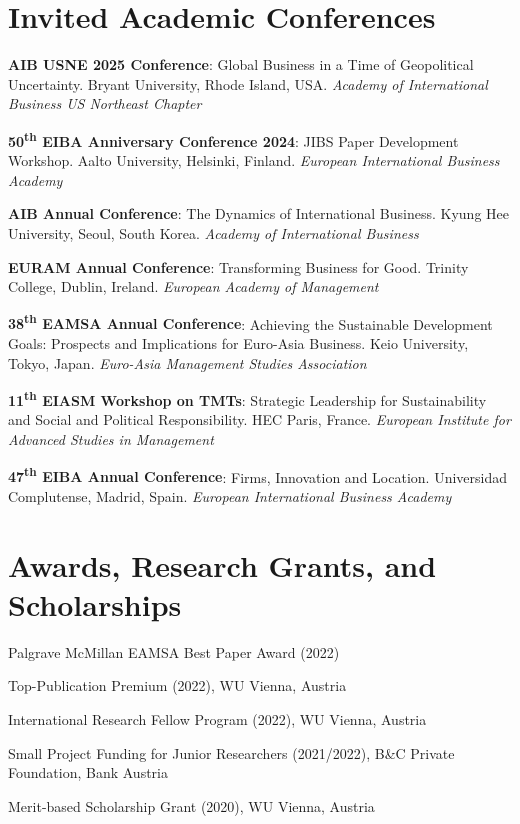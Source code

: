 \documentclass[11pt,a4paper]{article}
\begin{document}
\begin{cv}
\section{Invited Academic Conferences}
\begin{cvlist}{}
    \item[2025]
    \textbf{AIB USNE 2025 Conference}: Global Business in a Time of Geopolitical Uncertainty. Bryant University, Rhode Island, USA. \textit{Academy of International Business US Northeast Chapter}
    
    \item[2024]
    \textbf{50\textsuperscript{th} EIBA Anniversary Conference 2024}: JIBS Paper Development Workshop. Aalto University, Helsinki, Finland. \textit{European International Business Academy}
    
    \item[2024]
    \textbf{AIB Annual Conference}: The Dynamics of International Business. Kyung Hee University, Seoul, South Korea. \textit{Academy of International Business}
    
    \item[2023]
    \textbf{EURAM Annual Conference}: Transforming Business for Good. Trinity College, Dublin, Ireland. \textit{European Academy of Management}
    
    \item[2022]
    \textbf{38\textsuperscript{th} EAMSA Annual Conference}: Achieving the Sustainable Development Goals: Prospects and Implications for Euro-Asia Business. Keio University, Tokyo, Japan. \textit{Euro-Asia Management Studies Association}
    
    \item[2022]
    \textbf{11\textsuperscript{th} EIASM Workshop on TMTs}: Strategic Leadership for Sustainability and Social and Political Responsibility. HEC Paris, France. \textit{European Institute for Advanced Studies in Management}
    
    \item[2021]
    \textbf{47\textsuperscript{th} EIBA Annual Conference}: Firms, Innovation and Location. Universidad Complutense, Madrid, Spain. \textit{European International Business Academy}
\end{cvlist}

\section{Awards, Research Grants, and Scholarships}
\begin{cvlist}{}
  \item[finalist] Palgrave McMillan EAMSA Best Paper Award (2022)
  \item[EUR 1000] Top-Publication Premium (2022), WU Vienna, Austria 
  \item[EUR 2300] International Research Fellow Program (2022), WU Vienna, Austria
  \item[EUR 8000] Small Project Funding for Junior Researchers (2021/2022), B\&C Private Foundation, Bank Austria
  \item[EUR 1000] Merit-based Scholarship Grant (2020), WU Vienna, Austria
\end{cvlist}


\end{cv}
\end{document}
